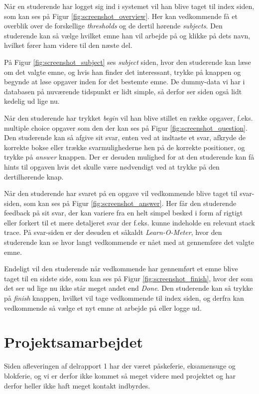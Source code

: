 \documentclass[11pt, a4paper]{article}
\begin{document}
Når en studerende har logget sig ind i systemet vil han blive taget til index siden, som kan ses på Figur \ref{fig:screenshot_overview}. Her kan vedkommende få et overblik over de forskellige \emph{thresholds} og de dertil hørende \emph{subjects}. Den studerende kan så vælge hvilket emne han vil arbejde på og klikke på dets navn, hvilket fører ham videre til den næste del.

På Figur \ref{fig:screenshot_subject} ses \emph{subject} siden, hvor den studerende kan læse om det valgte emne, og hvis han finder det interessant, trykke på knappen og begynde at løse opgaver inden for det bestemte emne. De dummy-data vi har i databasen på nuværende tidspunkt er lidt simple, så derfor ser siden også lidt kedelig ud lige nu.

Når den studerende har trykket \emph{begin} vil han blive stillet en række opgaver, f.eks. multiple choice opgaver som den der kan ses på Figur \ref{fig:screenshot_question}. Den studerende kan så afgive sit svar, enten ved at indtaste et svar, afkryde de korrekte bokse eller trække svarmulighederne hen på de korrekte positioner, og trykke på \emph{answer} knappen. Der er desuden mulighed for at den studerende kan få hints til opgaven hvis det skulle være nødvendigt ved at trykke på den dertilhørende knap.

Når den studerende har svaret på en opgave vil vedkommende blive taget til svar-siden, som kan ses på Figur \ref{fig:screenshot_answer}. Her får den studerende feedback på sit svar, der kan variere fra en helt simpel besked i form af rigtigt eller forkert til et mere detaljeret svar der f.eks. kunne indeholde en relevant stack trace. På svar-siden er der desuden et såkaldt \emph{Learn-O-Meter}, hvor den studerende kan se hvor langt vedkommende er nået med at gennemføre det valgte emne.

Endeligt vil den studerende når vedkommende har gennemført et emne blive taget til en sidste side, som kan ses på Figur \ref{fig:screenshot_finish}, hvor der som det ser ud lige nu ikke står meget andet end \emph{Done}. Den studerende kan så trykke på \emph{finish} knappen, hvilket vil tage vedkommende til index siden, og derfra kan vedkommende så vælge et nyt emne at arbejde på eller logge ud.

\section{Projektsamarbejdet}
\label{sec:projektsamarbejdet}
Siden afleveringen af delrapport 1 har der været påskeferie, eksamensuge og blokferie, og vi er derfor ikke kommet så meget videre med projektet og har derfor heller ikke haft meget kontakt indbyrdes.
\end{document}
